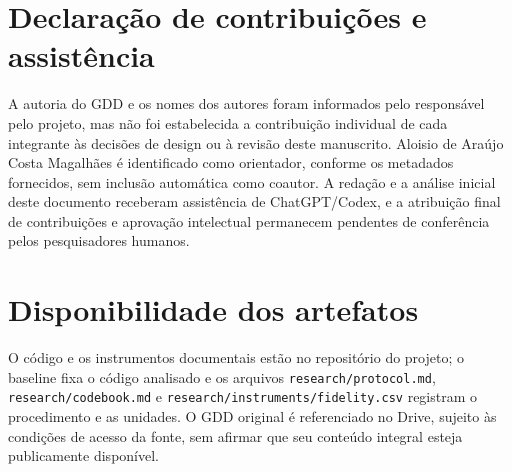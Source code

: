 \section*{Declaração de contribuições e assistência}
A autoria do GDD e os nomes dos autores foram informados pelo responsável pelo projeto, mas não foi estabelecida a contribuição individual de cada integrante às decisões de design ou à revisão deste manuscrito. Aloisio de Araújo Costa Magalhães é identificado como orientador, conforme os metadados fornecidos, sem inclusão automática como coautor. A redação e a análise inicial deste documento receberam assistência de ChatGPT/Codex, e a atribuição final de contribuições e aprovação intelectual permanecem pendentes de conferência pelos pesquisadores humanos.

\section*{Disponibilidade dos artefatos}
O código e os instrumentos documentais estão no repositório do projeto; o baseline fixa o código analisado e os arquivos \texttt{research/protocol.md}, \texttt{research/codebook.md} e \texttt{research/instruments/fidelity.csv} registram o procedimento e as unidades. O GDD original é referenciado no Drive, sujeito às condições de acesso da fonte, sem afirmar que seu conteúdo integral esteja publicamente disponível.
